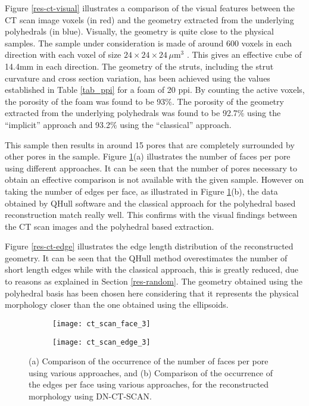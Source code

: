 Figure \ref{res-ct-visual} illustrates a comparison of the visual features between the CT scan image voxels (in red) and the geometry extracted from the underlying polyhedrals (in blue). Visually, the geometry is quite close to the physical samples. The sample under consideration is made of around 600 voxels in each direction with each voxel of size $ 24\times24\times24\,\mu\text{m}^3 $ . This gives an effective cube of 14.4mm in each direction. The geometry of the struts, including the strut curvature and cross section variation, has been achieved using the values established in Table \ref{tab_ppi} for a foam of 20 ppi. By counting the active voxels, the porosity of the foam was found to be 93\%. The porosity of the geometry extracted from the underlying polyhedrals was found to be 92.7\% using the ``implicit'' approach and 93.2\% using the ``classical'' approach.

This sample then results in around 15 pores that are completely surrounded by other pores in the sample. Figure \ref{res-ct-face}(a) illustrates the number of faces per pore using different approaches. It can be seen that the number of pores necessary to obtain an effective comparison is not available with the given sample. However on taking the number of edges per face, as illustrated in Figure \ref{res-ct-face}(b), the data obtained by QHull software and the classical approach for the polyhedral based reconstruction match really well. This confirms with the visual findings between the CT scan images and the polyhedral based extraction. 

Figure \ref{res-ct-edge} illustrates the edge length distribution of the reconstructed geometry. It can be seen that the QHull method overestimates the number of short length edges while with the classical approach, this is greatly reduced, due to reasons as explained in Section \ref{res-random}. The geometry obtained using the polyhedral basis has been chosen here considering that it represents the physical morphology closer than the one obtained using the ellipsoids.

\begin{figure}
	\centering
	\begin{subfigure}[b]{0.49\textwidth}
		\texttt{[image: ct\_scan\_face\_3]}
		\caption{}
	\end{subfigure}
	\begin{subfigure}[b]{0.49\textwidth}
		\texttt{[image: ct\_scan\_edge\_3]}
		\caption{}
	\end{subfigure}
	\caption{(a) Comparison of the occurrence of the number of faces per pore using various approaches, and (b) Comparison of the occurrence of the edges per face using various approaches, for the reconstructed morphology using DN-CT-SCAN. }\label{res-ct-face}
\end{figure}

